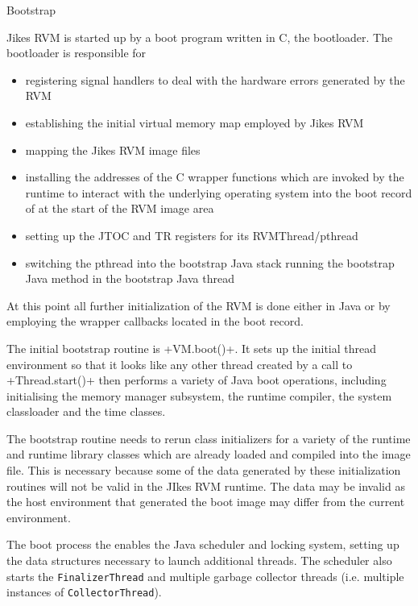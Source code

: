 \begin{section}{Bootstrap}
\label{sec:bootstrap}

Jikes RVM is started up by a boot program written in C, the bootloader. The bootloader is responsible for
\begin{itemize}
  \item registering signal handlers to deal with the hardware errors generated by the RVM
  \item establishing the initial virtual memory map employed by Jikes RVM
  \item mapping the Jikes RVM image files
  \item installing the addresses of the C wrapper functions which are invoked by the runtime to interact with the underlying operating system into the boot record of at the start of the RVM image area
  \item setting up the JTOC and TR registers for its RVMThread/pthread
  \item switching the pthread into the bootstrap Java stack running the bootstrap Java method in the bootstrap Java thread
\end{itemize}

At this point all further initialization of the RVM is done either in Java or by employing the wrapper callbacks located in the boot record.

The initial bootstrap routine is \spverb+VM.boot()+. It sets up the initial thread environment so that it looks like any other thread created by a call to \spverb+Thread.start()+ then performs a variety of Java boot operations, including initialising the memory manager subsystem, the runtime compiler, the system classloader and the time classes.

The bootstrap routine needs to rerun class initializers for a variety of the runtime and runtime library classes which are already loaded and compiled into the image file. This is necessary because some of the data generated by these initialization routines will not be valid in the JIkes RVM runtime. The data may be invalid as the host environment that generated the boot image may differ from the current environment.

The boot process the enables the Java scheduler and locking system, setting up the data structures necessary to launch additional threads. The scheduler also starts the \texttt{Fi\-na\-li\-zer\-Thread} and multiple garbage collector threads (i.e. multiple instances of \texttt{Col\-lec\-tor\-Thread}).


\end{section}
